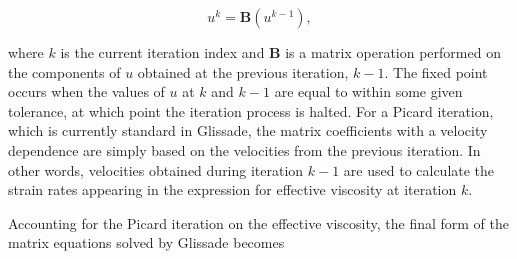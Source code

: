 \begin{equation}
  u^{k} = \mathbf{B}\left( u^{k-1} \right),
\end{equation}

\noindent
where $k$ is the current iteration index and \textbf{B} is a matrix operation performed on the components of $u$ obtained at the previous iteration, $k-1$. The fixed point occurs when the values of $u$ at $k$ and $k-1$ are equal to within some given tolerance, at which point the iteration process is halted. %
For a Picard iteration, which is currently standard in Glissade, the matrix coefficients with a velocity dependence are simply based on the velocities from the previous iteration. In other words, velocities obtained during iteration $k-1$ are used to calculate the strain rates appearing in the expression for effective viscosity at iteration $k$.

Accounting for %
the Picard iteration on the effective viscosity, the final form of the matrix equations solved by Glissade becomes 


